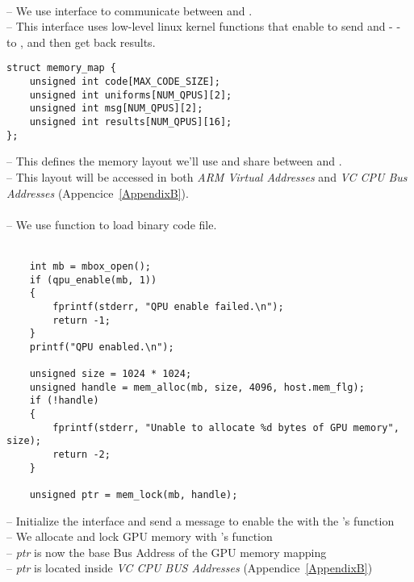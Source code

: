 \\
-- We use \mail{} interface to communicate between \vc{} and \cpu.\\
-- This interface uses low-level linux kernel functions that enable  to send  and  -  - to , and then get back results.\\



\begin{lstlisting}
struct memory_map {
    unsigned int code[MAX_CODE_SIZE];
    unsigned int uniforms[NUM_QPUS][2];
    unsigned int msg[NUM_QPUS][2];
    unsigned int results[NUM_QPUS][16];
};
\end{lstlisting}
-- This defines the memory layout we’ll use and share between  and .\\
-- This layout will be accessed in both \emph{ARM Virtual Addresses} and \emph{VC CPU Bus Addresses} (Appencice~\ref{AppendixB}).\\

\\
-- We use  function to load  binary code file.\\~\\

\begin{lstlisting}
    int mb = mbox_open();
    if (qpu_enable(mb, 1))
    {
        fprintf(stderr, "QPU enable failed.\n");
        return -1;
    }
    printf("QPU enabled.\n");

    unsigned size = 1024 * 1024;
    unsigned handle = mem_alloc(mb, size, 4096, host.mem_flg);
    if (!handle)
    {
        fprintf(stderr, "Unable to allocate %d bytes of GPU memory", size);
        return -2;
    }

    unsigned ptr = mem_lock(mb, handle);
\end{lstlisting}

-- Initialize the \mail{} interface and send a message to enable the \qpu{} with the  \mail{}'s function\\
-- We allocate and lock GPU memory with  \mail{}'s function\\
-- \emph{ptr} is now the base Bus Address of the GPU memory mapping\\
-- \emph{ptr} is located inside \emph{VC CPU BUS Addresses} (Appendice~\ref{AppendixB})\\

